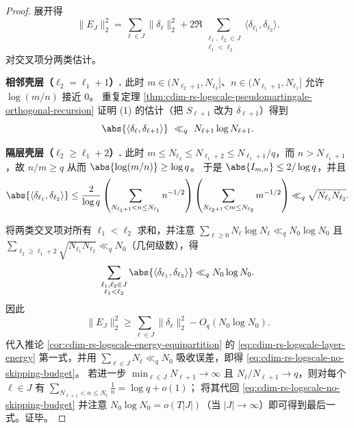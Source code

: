 \begin{proof}
展开得
\[
\|E_J\|_2^2
=\sum_{\ell\in J}\|\delta_\ell\|_2^2
  +2\Re\!\sum_{\substack{\ell_1,\ell_2\in J\\ \ell_1<\ell_2}}\langle \delta_{\ell_1},\delta_{\ell_2}\rangle.
\]
对交叉项分两类估计。
\par
\textbf{相邻壳层（\(\ell_2=\ell_1+1\)）.}
此时 \(m\in(N_{\ell_2+1},N_{\ell_2}]\)、\(n\in(N_{\ell_1+1},N_{\ell_1}]\) 允许 \(\log(m/n)\) 接近 \(0\)。
重复定理 \ref{thm:cdim-rs-logscale-pseudomartingale-orthogonal-recursion} 证明 (1) 的估计（把 \(S_{\ell+1}\) 改为 \(\delta_{\ell+1}\)）得到
\[
\abs{\langle \delta_\ell,\delta_{\ell+1}\rangle}\ \ll_q\ N_{\ell+1}\log N_{\ell+1}.
\]
\par
\textbf{隔层壳层（\(\ell_2\ge \ell_1+2\)）.}
此时 \(m\le N_{\ell_2}\le N_{\ell_1+2}\le N_{\ell_1+1}/q\)，而 \(n>N_{\ell_1+1}\)，故 \(n/m\ge q\) 从而 \(\abs{\log(m/n)}\ge \log q\)。
于是 \(\abs{I_{m,n}}\le 2/\log q\)，并且
\[
\abs{\langle \delta_{\ell_1},\delta_{\ell_2}\rangle}
\le \frac{2}{\log q}\left(\sum_{N_{\ell_1+1}<n\le N_{\ell_1}}n^{-1/2}\right)\left(\sum_{N_{\ell_2+1}<m\le N_{\ell_2}}m^{-1/2}\right)
\ll_q \sqrt{N_{\ell_1}N_{\ell_2}}.
\]
\par
将两类交叉项对所有 \(\ell_1<\ell_2\) 求和，并注意 \(\sum_{\ell\ge 0}N_\ell\log N_\ell\ll_q N_0\log N_0\) 且 \(\sum_{\ell_2\ge \ell_1+2}\sqrt{N_{\ell_1}N_{\ell_2}}\ll_q N_0\)（几何级数），得
\[
\sum_{\substack{\ell_1,\ell_2\in J\\ \ell_1<\ell_2}}\abs{\langle \delta_{\ell_1},\delta_{\ell_2}\rangle}
\ll_q N_0\log N_0.
\]
因此
\[
\|E_J\|_2^2
\ge \sum_{\ell\in J}\|\delta_\ell\|_2^2-O_q(N_0\log N_0).
\]
代入推论 \ref{cor:cdim-rs-logscale-energy-equipartition} 的 \eqref{eq:cdim-rs-logscale-layer-energy} 第一式，并用
\(\sum_{\ell\in J}N_\ell\ll_q N_0\)
吸收误差，即得 \eqref{eq:cdim-rs-logscale-no-skipping-budget}。
若进一步 \(\min_{\ell\in J}N_{\ell+1}\to\infty\) 且 \(N_\ell/N_{\ell+1}\to q\)，则对每个 \(\ell\in J\) 有
\(
\sum_{N_{\ell+1}<n\le N_\ell}\frac1n=\log q+o(1)
\)；
将其代回 \eqref{eq:cdim-rs-logscale-no-skipping-budget} 并注意 \(N_0\log N_0=o(T|J|)\)（当 \(|J|\to\infty\)）即可得到最后一式。证毕。
\end{proof}

